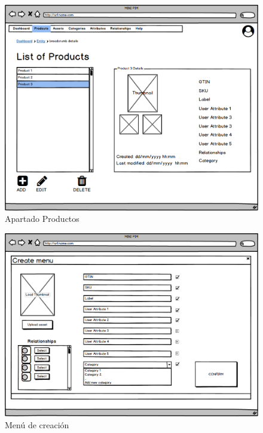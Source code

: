\begin{figure}[H]
    \includegraphics[width=1\linewidth]{mockups/RF2.1_boceto1.png}
    \caption{Apartado Productos}
   \end{figure}
\vspace{1.0cm}

\begin{figure}[H]
    \includegraphics[width=1\linewidth]{mockups/RF2.1_boceto2.png}
    \caption{Menú de creación}
   \end{figure}
\vspace{1.0cm}

\newpage %